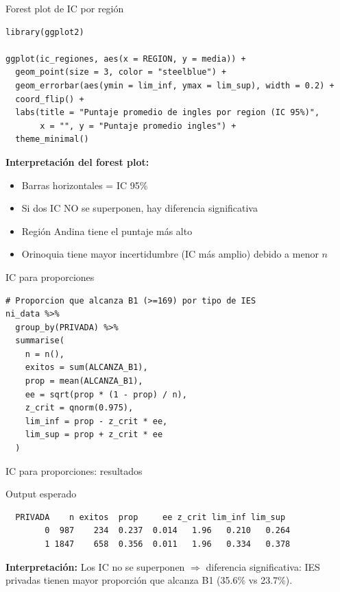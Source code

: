 \documentclass[aspectratio=169, 11pt]{beamer}
\begin{document}
\begin{frame}[fragile]{Forest plot de IC por región}
\begin{lstlisting}
library(ggplot2)

ggplot(ic_regiones, aes(x = REGION, y = media)) +
  geom_point(size = 3, color = "steelblue") +
  geom_errorbar(aes(ymin = lim_inf, ymax = lim_sup), width = 0.2) +
  coord_flip() +
  labs(title = "Puntaje promedio de ingles por region (IC 95%)",
       x = "", y = "Puntaje promedio ingles") +
  theme_minimal()
\end{lstlisting}

\vspace{0.3cm}
\textbf{Interpretación del forest plot:}
\begin{itemize}
\item Barras horizontales = IC 95\%
\item Si dos IC NO se superponen, hay diferencia significativa
\item Región Andina tiene el puntaje más alto
\item Orinoquia tiene mayor incertidumbre (IC más amplio) debido a menor $n$
\end{itemize}
\end{frame}

\begin{frame}[fragile]{IC para proporciones}
\begin{lstlisting}
# Proporcion que alcanza B1 (>=169) por tipo de IES
ni_data %>%
  group_by(PRIVADA) %>%
  summarise(
    n = n(),
    exitos = sum(ALCANZA_B1),
    prop = mean(ALCANZA_B1),
    ee = sqrt(prop * (1 - prop) / n),
    z_crit = qnorm(0.975),
    lim_inf = prop - z_crit * ee,
    lim_sup = prop + z_crit * ee
  )
\end{lstlisting}
\end{frame}

\begin{frame}[fragile]{IC para proporciones: resultados}
\begin{exampleblock}{Output esperado}
\small
\begin{verbatim}
  PRIVADA    n exitos  prop     ee z_crit lim_inf lim_sup
        0  987    234  0.237  0.014   1.96   0.210   0.264
        1 1847    658  0.356  0.011   1.96   0.334   0.378
\end{verbatim}
\end{exampleblock}

\vspace{0.3cm}
\textbf{Interpretación:}
Los IC no se superponen $\Rightarrow$ diferencia significativa: IES privadas tienen mayor proporción que alcanza B1 (35.6\% vs 23.7\%).
\end{frame}
\end{document}
